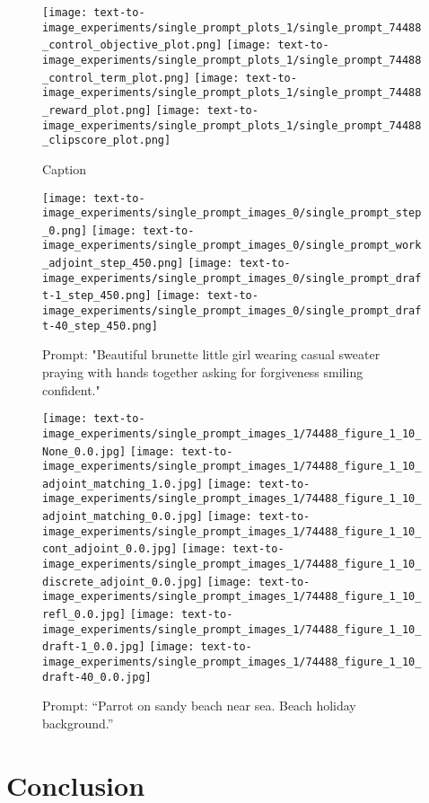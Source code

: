 \documentclass[]{fairmeta}
\begin{document}
\begin{figure}
    \centering
    \texttt{[image: text-to-image\_experiments/single\_prompt\_plots\_1/single\_prompt\_74488\_control\_objective\_plot.png]}
    \texttt{[image: text-to-image\_experiments/single\_prompt\_plots\_1/single\_prompt\_74488\_control\_term\_plot.png]}
    \texttt{[image: text-to-image\_experiments/single\_prompt\_plots\_1/single\_prompt\_74488\_reward\_plot.png]}
    \texttt{[image: text-to-image\_experiments/single\_prompt\_plots\_1/single\_prompt\_74488\_clipscore\_plot.png]}
    \caption{Caption}
    \label{fig:enter-label}
\end{figure}

\begin{figure}
    \centering
    \texttt{[image: text-to-image\_experiments/single\_prompt\_images\_0/single\_prompt\_step\_0.png]}
    \texttt{[image: text-to-image\_experiments/single\_prompt\_images\_0/single\_prompt\_work\_adjoint\_step\_450.png]}
    \texttt{[image: text-to-image\_experiments/single\_prompt\_images\_0/single\_prompt\_draft-1\_step\_450.png]}
    \texttt{[image: text-to-image\_experiments/single\_prompt\_images\_0/single\_prompt\_draft-40\_step\_450.png]}
    \caption{Prompt: "Beautiful brunette little girl wearing casual sweater praying with hands together asking for forgiveness smiling confident."}
    \label{fig:enter-label}
\end{figure}

\begin{figure}
    \centering
    \texttt{[image: text-to-image\_experiments/single\_prompt\_images\_1/74488\_figure\_1\_10\_None\_0.0.jpg]}
    \texttt{[image: text-to-image\_experiments/single\_prompt\_images\_1/74488\_figure\_1\_10\_adjoint\_matching\_1.0.jpg]}
    \texttt{[image: text-to-image\_experiments/single\_prompt\_images\_1/74488\_figure\_1\_10\_adjoint\_matching\_0.0.jpg]}
    \texttt{[image: text-to-image\_experiments/single\_prompt\_images\_1/74488\_figure\_1\_10\_cont\_adjoint\_0.0.jpg]}
    \texttt{[image: text-to-image\_experiments/single\_prompt\_images\_1/74488\_figure\_1\_10\_discrete\_adjoint\_0.0.jpg]}
    \texttt{[image: text-to-image\_experiments/single\_prompt\_images\_1/74488\_figure\_1\_10\_refl\_0.0.jpg]}
    \texttt{[image: text-to-image\_experiments/single\_prompt\_images\_1/74488\_figure\_1\_10\_draft-1\_0.0.jpg]}
    \texttt{[image: text-to-image\_experiments/single\_prompt\_images\_1/74488\_figure\_1\_10\_draft-40\_0.0.jpg]}
    \caption{Prompt: “Parrot on sandy beach near sea. Beach holiday background.”}
    \label{fig:enter-label}
\end{figure}

\section{Conclusion}
\label{sec:conclusion}

\clearpage
\newpage



\clearpage
\newpage
\beginappendix


\end{document}
